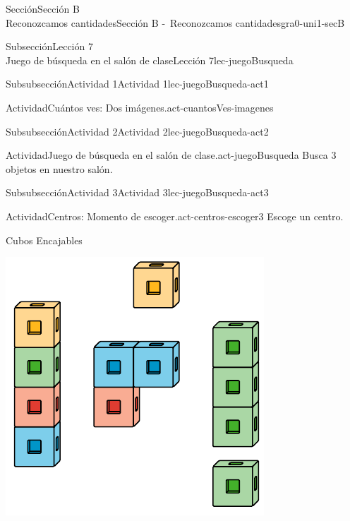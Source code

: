 \begin{sectionptx}{Sección}{{\Large Sección B\\}Reconozcamos cantidades}{}{Sección B -~Reconozcamos cantidades}{}{}{gra0-uni1-secB}
\begin{subsectionptx}{Subsección}{{\normalsize Lección 7\\[-0.05cm]}Juego de búsqueda en el salón de clase}{}{Lección 7}{}{}{lec-juegoBusqueda}
\begin{subsubsectionptx}{Subsubsección}{Actividad 1}{}{Actividad 1}{}{}{lec-juegoBusqueda-act1}
\begin{activity}{Actividad}{Cuántos ves: Dos imágenes.}{act-cuantosVes-imagenes}
\begin{sidebyside}{2}{0}{0}{0}
\begin{sbspanel}{0.5}
\end{sbspanel}%
\end{sidebyside}%
\end{activity}%
\end{subsubsectionptx}
%
%
\typeout{************************************************}
\typeout{************************************************}
%
\begin{subsubsectionptx}{Subsubsección}{Actividad 2}{}{Actividad 2}{}{}{lec-juegoBusqueda-act2}
\begin{activity}{Actividad}{Juego de búsqueda en el salón de clase.}{act-juegoBusqueda}%
Busca 3 objetos en nuestro salón.%
\end{activity}%
\end{subsubsectionptx}
%
%
\typeout{************************************************}
\typeout{************************************************}
%
\clearpage
\begin{subsubsectionptx}{Subsubsección}{Actividad 3}{}{Actividad 3}{}{}{lec-juegoBusqueda-act3}
\begin{activity}{Actividad}{Centros: Momento de escoger.}{act-centros-escoger3}%
Escoge un centro.%
\begin{sidebyside}{2}{0.025}{0.025}{0.05}%
\begin{sbspanel}{0.45}%
Cubos Encajables%
\par
\includegraphics[max width=\linewidth, center]{external/svg-source/tikz-file-128850.pdf}

\end{sbspanel}
\end{sidebyside}
\end{activity}
\end{subsubsectionptx}
\end{subsectionptx}
\end{sectionptx}
